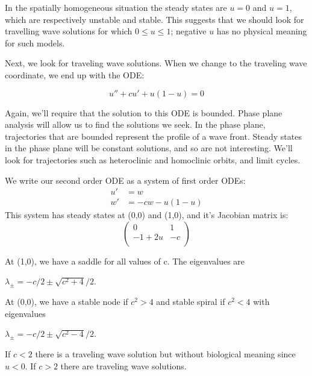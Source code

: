\documentclass[]{article}
\numberwithin{equation}{section}		%
\begin{document}
In the spatially homogeneous situation the steady states are $u = 0$ and $u = 1$, which
are respectively unstable and stable. This suggests that we should look for travelling
wave solutions for which $ 0\leq u \leq 1$; negative $u$ has no physical meaning for such models.

Next, we look for traveling wave solutions. When we change to the traveling wave coordinate, we end up with the ODE:

\begin{equation}
    u''+cu'+u(1-u)=0
\end{equation}

Again, we'll require that the solution to this ODE is bounded.
Phase plane analysis will allow us to find the solutions we seek. In
the phase plane, trajectories that are bounded represent the profile
of a wave front. Steady states in the phase plane will be constant
solutions, and so are not interesting. We'll look for trajectories
such as heteroclinic and homoclinic orbits, and limit cycles.

We write our second order ODE as a system of first order ODEs:
\begin{align}
    u'&=w\\
    w'&=-cw-u(1-u)
\end{align}
This system has steady states at (0,0) and (1,0), and it's Jacobian
matrix is:
\begin{equation*}
\begin{pmatrix}
  0 & 1 \\
  -1+2u & -c \\
\end{pmatrix}
\end{equation*}

At (1,0), we have a saddle for all values of c. The eigenvalues are

\begin{center} $\lambda_{\pm}=-c/2\pm{}\sqrt{c^2+4}/2$. \\\end{center}

At (0,0), we have a stable node if $c^2 >4$ and stable spiral if $c^2 < 4$ with eigenvalues

\begin{center} $\lambda_{\pm}=-c/2\pm{}\sqrt{c^2-4}/2$.\\\end{center}

If $c<2$ there is a traveling wave solution but without biological meaning since $u<0$.
If $c>2$ there are traveling wave solutions.
\end{document}
